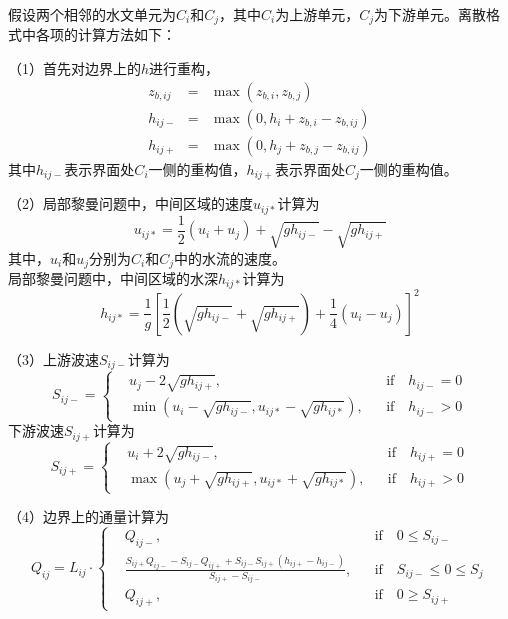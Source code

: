假设两个相邻的水文单元为$C_i$和$C_j$，其中$C_i$为上游单元，$C_j$为下游单元。离散格式中各项的计算方法如下：

（1）首先对边界上的$h$进行重构\citep{audusse2004scientificcomputing}，
\begin{eqnarray}
z_{b,ij} & = & \max\left(z_{b,i}, z_{b,j}\right) \\
h_{ij-} & = & \max\left(0, h_i + z_{b,i} - z_{b,ij} \right) \\
h_{ij+} & = & \max\left(0, h_j + z_{b,j} - z_{b,ij} \right)
\end{eqnarray}
其中$h_{ij-}$表示界面处$C_i$一侧的重构值，$h_{ij+}$表示界面处$C_j$一侧的重构值。

（2）局部黎曼问题中，中间区域的速度$u_{ij*}$计算为
	\begin{equation}
		u_{ij*} = \frac{1}{2}\left(u_i + u_j\right) + \sqrt{g h_{ij-}} - \sqrt{g h_{ij+}}
	\end{equation}
其中，$u_i$和$u_j$分别为$C_i$和$C_j$中的水流的速度。 \\
局部黎曼问题中，中间区域的水深$h_{ij*}$计算为
	\begin{equation}
		h_{ij*} = \frac{1}{g}\left[\frac{1}{2}\left(\sqrt{g h_{ij-}} + \sqrt{g h_{ij+}}\right) + \frac{1}{4}\left(u_i - u_j\right)\right]^2
	\end{equation}

（3）上游波速$S_{ij-}$计算为
	\begin{equation}
		S_{ij-} = \left\{
		\begin{aligned}
			&u_j - 2\sqrt{gh_{ij+}}, && \mbox{if} \quad h_{ij-} = 0 \\
			& \min \left(u_i - \sqrt{gh_{ij-}}, u_{ij*} - \sqrt{gh_{ij*}}\right), && \mbox{if} \quad h_{ij-} > 0
		\end{aligned}\right.
	\end{equation}
下游波速$S_{ij+}$计算为
	\begin{equation}
		S_{ij+} = \left\{
		\begin{aligned}
			&u_i + 2\sqrt{gh_{ij-}}, && \mbox{if} \quad h_{ij+} = 0 \\
			& \max \left(u_j + \sqrt{gh_{ij+}}, u_{ij*} + \sqrt{gh_{ij*}}\right), && \mbox{if} \quad h_{ij+} > 0
		\end{aligned}\right.
	\end{equation}

（4）边界上的通量计算为
\begin{equation}
	Q_{ij} = L_{ij} \cdot \left\{
	\begin{aligned}
		& Q_{ij-}, && \mbox{if} \quad 0\leq S_{ij-} \\
		& \frac{S_{ij+} Q_{ij-} - S_{ij-} Q_{ij+} + S_{ij-} S_{ij+} \left(h_{ij+} - h_{ij-}\right)}{S_{ij+}-S_{ij-}} , && \mbox{if} \quad S_{ij-} \leq 0\leq S_j\\
		& Q_{ij+}, && \mbox{if} \quad 0\geq S_{ij+}
	\end{aligned}\right.
\end{equation}

